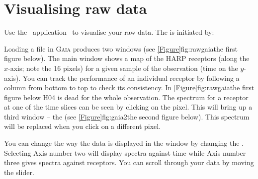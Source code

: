 \documentclass[11pt,oneside,chapters]{starlink}
\begin{document}
\section{Visualising raw data}
\label{sec:exam}

Use the \starlink\ application \gaia\ to visualise your raw data. The
is initiated by:

\begin{terminalv}
\end{terminalv}

Loading a file in \textsc{Gaia} produces two windows (see
\cref{Figure}{fig:rawgaia}{the first figure below}). The main window
shows a map of the HARP receptors (along the $x$-axis; note the 16
pixels) for a given sample of the observation (time on the $y$-axis).
You can track the performance of an individual receptor by following a
column from bottom to top to check its consistency. In
\cref{Figure}{fig:rawgaia}{the first figure below} H04 is dead for the
whole observation. The spectrum for a receptor at one of the time
slices can be seen by clicking on the pixel. This will bring up a
third window -- the  (see
\cref{Figure}{fig:gaia2}{the second figure below}). This spectrum will
be replaced when you click on a different pixel.

You can change the way the data is displayed in the  window by changing the .
Selecting Axis number two will display spectra against time while Axis
number three gives spectra against receptors. You can scroll through
your data by moving the  slider.



\end{document}
